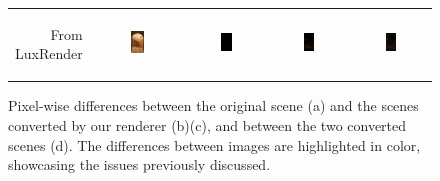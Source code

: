 \begin{figure}[t!bp]
\begin{tabular}{@{}r@{ } c@{ } c@{ } c@{ } c }
		\begin{sideways} \parbox[b]{20mm} {\small{From\\ LuxRender}} \end{sideways} &
		\includegraphics[width=0.15\textwidth]{figs/4_results/staircase/1_from_lux.png} &
		\includegraphics[width=0.15\textwidth]{figs/4_results/staircase/diff_lux-mitsuba.png} &
		\includegraphics[width=0.15\textwidth]{figs/4_results/staircase/diff_lux-pbrt.png} &
		\includegraphics[width=0.15\textwidth]{figs/4_results/staircase/diff_mitsuba-pbrt.png}
	\end{tabular}
	\caption{Pixel-wise differences between the original scene (a) and the scenes converted by our renderer (b)(c), and between the two converted scenes (d). The differences between images are highlighted in color, showcasing the issues previously discussed. }
	\label{fig:diffs}
\end{figure}






